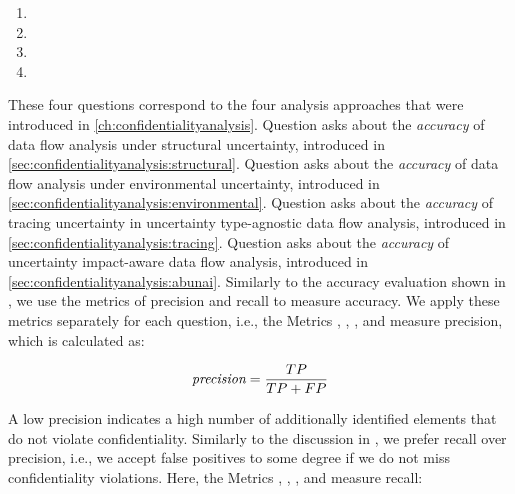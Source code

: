 \begin{enumerate}[leftmargin=\GQMquestionsIndent]
  \item[\question{8}{1}] \textGviiiQi 
  \item[\question{8}{2}] \textGviiiQii
  \item[\question{8}{3}] \textGviiiQiii
  \item[\question{8}{4}] \textGviiiQiv
\end{enumerate}

\label{gqm:text:q:8:1}\label{gqm:text:q:8:2}\label{gqm:text:q:8:3}\label{gqm:text:q:8:4}
These four questions correspond to the four analysis approaches that were introduced in \autoref{ch:confidentialityanalysis}.
Question  asks about the \emph{accuracy} of data flow analysis under structural uncertainty, introduced in \autoref{sec:confidentialityanalysis:structural}.
Question  asks about the \emph{accuracy} of data flow analysis under environmental uncertainty, introduced in \autoref{sec:confidentialityanalysis:environmental}.
Question  asks about the \emph{accuracy} of tracing uncertainty in uncertainty type-agnostic data flow analysis, introduced in \autoref{sec:confidentialityanalysis:tracing}.
Question  asks about the \emph{accuracy} of uncertainty impact-aware data flow analysis, introduced in \autoref{sec:confidentialityanalysis:abunai}.
Similarly to the accuracy evaluation shown in , we use the metrics of precision and recall to measure accuracy.
We apply these metrics separately for each question, i.e., the Metrics \label{gqm:text:m:8:1:1}, \label{gqm:text:m:8:2:1}, \label{gqm:text:m:8:3:1}, and \label{gqm:text:m:8:4:1} measure precision, which is calculated as:

\begin{equation*}
  \emph{precision} = \frac{TP}{TP + FP}
\end{equation*}

A low precision indicates a high number of additionally identified elements that do not violate confidentiality.
Similarly to the discussion in , we prefer recall over precision, i.e., we accept false positives to some degree if we do not miss confidentiality violations.
Here, the Metrics \label{gqm:text:m:8:1:2}, \label{gqm:text:m:8:2:2}, \label{gqm:text:m:8:3:2}, and \label{gqm:text:m:8:4:2} measure recall:

